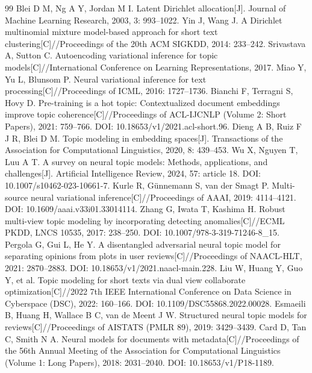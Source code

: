 \documentclass[11pt]{ctexart}
\begin{document}
\begin{thebibliography}{99}
\small
{} Blei D M, Ng A Y, Jordan M I. Latent Dirichlet allocation[J]. Journal of Machine Learning Research, 2003, 3: 993--1022.
 Yin J, Wang J. A Dirichlet multinomial mixture model-based approach for short text clustering[C]//Proceedings of the 20th ACM SIGKDD, 2014: 233--242.
 Srivastava A, Sutton C. Autoencoding variational inference for topic models[C]//International Conference on Learning Representations, 2017.
 Miao Y, Yu L, Blunsom P. Neural variational inference for text processing[C]//Proceedings of ICML, 2016: 1727--1736.
 Bianchi F, Terragni S, Hovy D. Pre-training is a hot topic: Contextualized document embeddings improve topic coherence[C]//Proceedings of ACL-IJCNLP (Volume 2: Short Papers), 2021: 759--766. DOI: 10.18653/v1/2021.acl-short.96.
 Dieng A B, Ruiz F J R, Blei D M. Topic modeling in embedding spaces[J]. Transactions of the Association for Computational Linguistics, 2020, 8: 439--453.
 Wu X, Nguyen T, Luu A T. A survey on neural topic models: Methods, applications, and challenges[J]. Artificial Intelligence Review, 2024, 57: article 18. DOI: 10.1007/s10462-023-10661-7.
 Kurle R, G\"unnemann S, van der Smagt P. Multi-source neural variational inference[C]//Proceedings of AAAI, 2019: 4114--4121. DOI: 10.1609/aaai.v33i01.33014114.
 Zhang G, Iwata T, Kashima H. Robust multi-view topic modeling by incorporating detecting anomalies[C]//ECML PKDD, LNCS 10535, 2017: 238--250. DOI: 10.1007/978-3-319-71246-8\_15.
 Pergola G, Gui L, He Y. A disentangled adversarial neural topic model for separating opinions from plots in user reviews[C]//Proceedings of NAACL-HLT, 2021: 2870--2883. DOI: 10.18653/v1/2021.naacl-main.228.
 Liu W, Huang Y, Guo Y, et al. Topic modeling for short texts via dual view collaborate optimization[C]//2022 7th IEEE International Conference on Data Science in Cyberspace (DSC), 2022: 160--166. DOI: 10.1109/DSC55868.2022.00028.
 Esmaeili B, Huang H, Wallace B C, van de Meent J W. Structured neural topic models for reviews[C]//Proceedings of AISTATS (PMLR 89), 2019: 3429--3439.
 Card D, Tan C, Smith N A. Neural models for documents with metadata[C]//Proceedings of the 56th Annual Meeting of the Association for Computational Linguistics (Volume 1: Long Papers), 2018: 2031--2040. DOI: 10.18653/v1/P18-1189.

\end{thebibliography}
\end{document}
